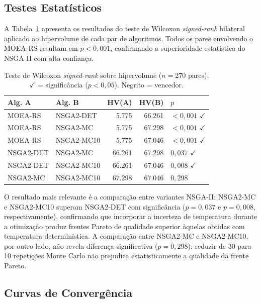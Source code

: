 \documentclass[a4paper,11pt]{article}
\newcommand{\moers}{MOEA\mbox{-}RS\xspace}
\begin{document}
\subsection{Testes Estatísticos}

A Tabela~\ref{tab:wilcoxon} apresenta os resultados do teste de Wilcoxon
\textit{signed-rank} bilateral aplicado ao hipervolume de cada par de
algoritmos.
Todos os pares envolvendo o \moers resultam em $p < 0{,}001$,
confirmando a superioridade estatística do NSGA-II com alta confiança.

\begin{table}[ht]
\centering
\caption{Teste de Wilcoxon \textit{signed-rank} sobre hipervolume ($n=270$ pares).
         $\checkmark$ = signific\^ancia ($p<0{,}05$). Negrito = vencedor.}
\label{tab:wilcoxon}
\small\begin{tabular}{llrrl}
\toprule
\textbf{Alg. A} & \textbf{Alg. B} & \textbf{HV(A)} & \textbf{HV(B)} & \textbf{$p$} \\
\midrule
MOEA-RS    & NSGA2-DET  &  5.775 & 66.261 & $<0{,}001$ $\checkmark$ \\
MOEA-RS    & NSGA2-MC   &  5.775 & 67.298 & $<0{,}001$ $\checkmark$ \\
MOEA-RS    & NSGA2-MC10 &  5.775 & 67.046 & $<0{,}001$ $\checkmark$ \\
NSGA2-DET  & NSGA2-MC   & 66.261 & 67.298 & $0{,}037$ $\checkmark$  \\
NSGA2-DET  & NSGA2-MC10 & 66.261 & 67.046 & $0{,}008$ $\checkmark$  \\
NSGA2-MC   & NSGA2-MC10 & 67.298 & 67.046 & $0{,}298$               \\
\bottomrule
\end{tabular}
\end{table}

O resultado mais relevante é a comparação entre variantes NSGA-II:
NSGA2-MC e NSGA2-MC10 superam NSGA2-DET com signific\^ancia ($p = 0{,}037$ e $p = 0{,}008$,
respectivamente), confirmando que incorporar a incerteza de temperatura
durante a otimização produz frentes Pareto de qualidade superior àquelas
obtidas com temperatura determinística.
A comparação entre NSGA2-MC e NSGA2-MC10, por outro lado, não revela diferença
significativa ($p = 0{,}298$): reduzir de 30 para 10 repetições Monte Carlo
não prejudica estatisticamente a qualidade da frente Pareto.

\subsection{Curvas de Converg\^encia}
\end{document}
